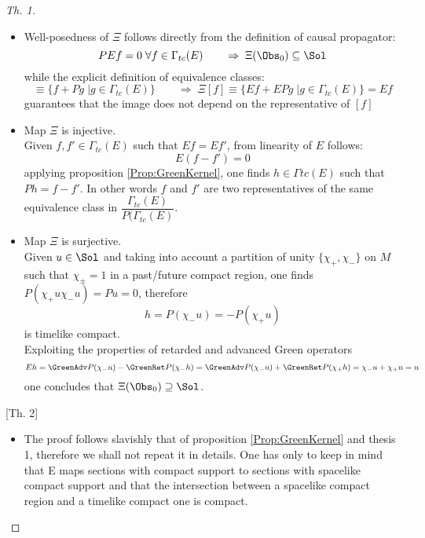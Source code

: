 \documentclass[Main]{subfiles}
\begin{document}
	\begin{proof}
	[Th. 1]
	\begin{itemize}
		\item Well-posedness of $\Xi$ follows directly from the definition of causal propagator:
			\begin{displaymath}
				P E f = 0 \; \forall f \in \Gamma_{tc}(E) \qquad \Rightarrow \; \Xi ( \Obs_0) \subseteq \Sol
			\end{displaymath}
			while the explicit definition of equivalence classes:
			\begin{displaymath}
				[f] \equiv \{ f + P g \; \vert g \in \Gamma_{tc}(E)\} \qquad\Rightarrow \;
				 \Xi [f] \equiv \{ E f + E P g \;\vert g \in \Gamma_{tc}(E)\} = E f
			\end{displaymath}
			guarantees that the image does not depend on the representative of $[f]$
		\item %
			Map $\Xi$ is injective.\\
			Given $f , f' \in \Gamma_{tc}(E)$ such that $E f = E f'$, from linearity of $E$ follows:
			\begin{displaymath}
				E ( f - f') = 0
			\end{displaymath}			
			applying proposition \ref{Prop:GreenKernel}, one finds $h \in \Gamma{tc}(E)$ such that $P h = f - f'$. 
			In other words $f$ and $f'$  are two representatives of the same equivalence class in $\dfrac{\Gamma_{tc}(E)}{P ( \Gamma_{tc}(E)} $.
		\item Map $\Xi$ is surjective.\\
			Given $u \in \Sol$ and taking into account a partition of unity $\{\chi_+, \chi_-\}$ on $M$ such that $\chi_\pm = 1$ in a past/future compact region, one finds $P ( \chi_+ u \chi_- u ) = P u=0$, therefore 
			\begin{displaymath}
				h = P(\chi_-u) = - P(\chi_+ u)
			\end{displaymath}
			is timelike compact.\\
			Exploiting the properties of retarded and advanced Green operators
			\begin{displaymath}
				E h = \GreenAdv P (\chi_- u ) - \GreenRet P (\chi_- h ) = 
				\GreenAdv P (\chi_- u ) + \GreenRet P (\chi_+ h ) = \chi_-u + \chi_+ u = u
			\end{displaymath} 
			one concludes that $\Xi ( \Obs_0) \supseteq \Sol$.
	\end{itemize}
	[Th. 2]
	\begin{itemize}
		\item The proof follows slavishly that of proposition \ref{Prop:GreenKernel} and thesis 1, therefore we shall not repeat it in details. 
			One has only to keep in mind that E maps sections with compact support to sections with spacelike compact support and that the intersection between a spacelike compact region and a timelike compact one is compact.
	\end{itemize}		
	\end{proof}
\end{document}
